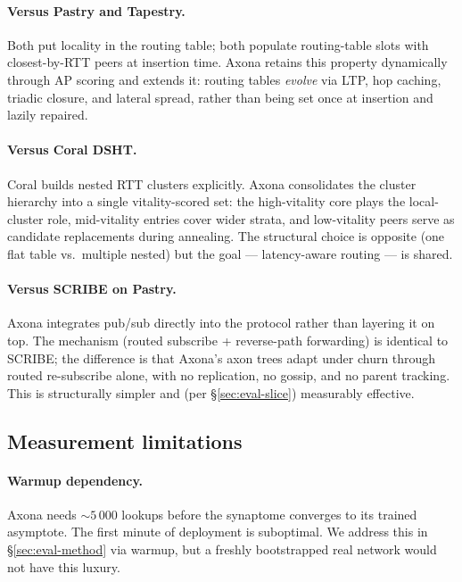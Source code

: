 \documentclass[conference]{IEEEtran}
\newcommand{\axona}{Axona\xspace}
\begin{document}
\paragraph{Versus Pastry and Tapestry.} Both put locality in the
routing table; both populate routing-table slots with closest-by-RTT
peers at insertion time. \axona retains this property dynamically
through AP scoring and extends it: routing tables \emph{evolve} via
LTP, hop caching, triadic closure, and lateral spread, rather than
being set once at insertion and lazily repaired.

\paragraph{Versus Coral DSHT.} Coral builds nested RTT clusters
explicitly. \axona consolidates the cluster hierarchy into a single
vitality-scored set: the high-vitality core plays the local-cluster
role, mid-vitality entries cover wider strata, and low-vitality peers
serve as candidate replacements during annealing. The structural
choice is opposite (one flat table vs.\ multiple nested) but the goal
--- latency-aware routing --- is shared.

\paragraph{Versus SCRIBE on Pastry.} \axona integrates pub/sub directly
into the protocol rather than layering it on top. The mechanism
(routed subscribe + reverse-path forwarding) is identical to SCRIBE; the
difference is that \axona's axon trees adapt under churn through routed
re-subscribe alone, with no replication, no gossip, and no parent
tracking. This is structurally simpler and (per
\S\ref{sec:eval-slice}) measurably effective.

\subsection{Measurement limitations}

\paragraph{Warmup dependency.} \axona needs $\sim\!5\,000$ lookups
before the synaptome converges to its trained asymptote. The first
minute of deployment is suboptimal. We address this in
\S\ref{sec:eval-method} via warmup, but a freshly bootstrapped real
network would not have this luxury.
\end{document}
